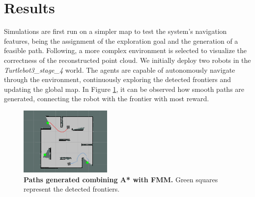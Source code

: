 \section{Results}
\label{sec:results}
Simulations are first run on a simpler map to test the system's navigation features, being the assignment of the exploration goal and the generation of a feasible path. Following, a more complex environment is selected to visualize the correctness of the reconstructed point cloud.
We initially deploy two robots in the \textit{Turtlebot3\_stage\_4} world. The agents are capable of autonomously navigate through the environment, continuously exploring the detected frontiers and updating the global map. In Figure \ref{fig:path}, it can be observed how smooth paths are generated, connecting the robot with the frontier with most reward.

\begin{figure}[h]
  \begin{center}
    \includegraphics[width=0.4\textwidth]{img/path.png}
  \end{center}
  \caption[]{
    \textbf{Paths generated combining A* with FMM.} 
    Green squares represent the detected frontiers.
  }
  \label{fig:path}
\end{figure}

